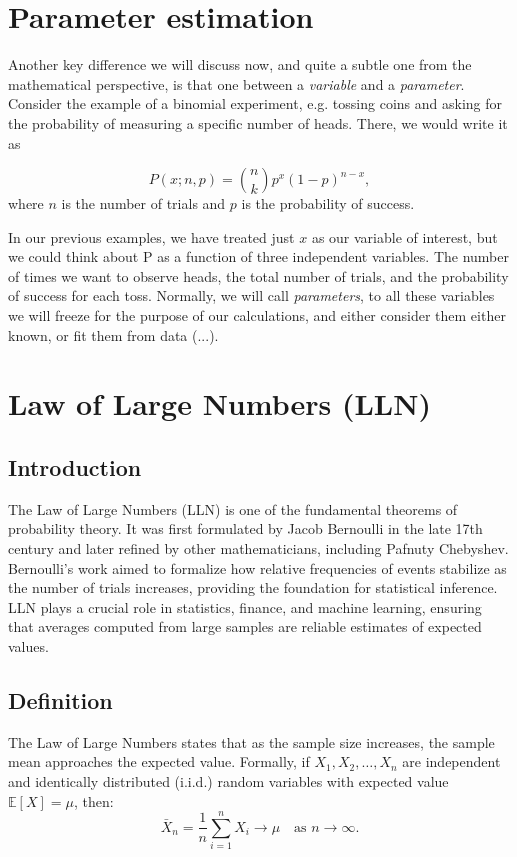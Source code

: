 \documentclass{book}
\begin{document}
\section{Parameter estimation}
Another key difference we will discuss now, and quite a subtle one from the mathematical perspective, is that one between a \textit{variable} and a \textit{parameter}. Consider the example of a binomial experiment, e.g. tossing coins and asking for the probability of measuring a specific number of heads. There, we would write it as 

\begin{equation}
    P(x; n, p) = \binom{n}{k} p^x (1-p)^{n-x},
\end{equation}
where $n$ is the number of trials and $p$ is the probability of success.

In our previous examples, we have treated just $x$ as our variable of interest, but we could think about P as a function of three independent variables. The number of times we want to observe heads, the total number of trials, and the probability of success for each toss. Normally, we will call \textit{parameters}, to all these variables we will freeze for the purpose of our calculations, and either consider them either known, or fit them from data (...).
 
 \newpage 
 
\section{Law of Large Numbers (LLN)}

\subsection*{Introduction}
The Law of Large Numbers (LLN) is one of the fundamental theorems of probability theory. It was first formulated by Jacob Bernoulli in the late 17th century and later refined by other mathematicians, including Pafnuty Chebyshev. Bernoulli's work aimed to formalize how relative frequencies of events stabilize as the number of trials increases, providing the foundation for statistical inference. LLN plays a crucial role in statistics, finance, and machine learning, ensuring that averages computed from large samples are reliable estimates of expected values.

\subsection{Definition}
The Law of Large Numbers states that as the sample size increases, the sample mean approaches the expected value. Formally, if $X_1, X_2, \dots, X_n$ are independent and identically distributed (i.i.d.) random variables with expected value $\mathbb{E}[X] = \mu$, then:
\begin{equation}
    \bar{X}_n = \frac{1}{n} \sum_{i=1}^{n} X_i \to \mu \quad \text{as } n \to \infty.
\end{equation}
\end{document}
